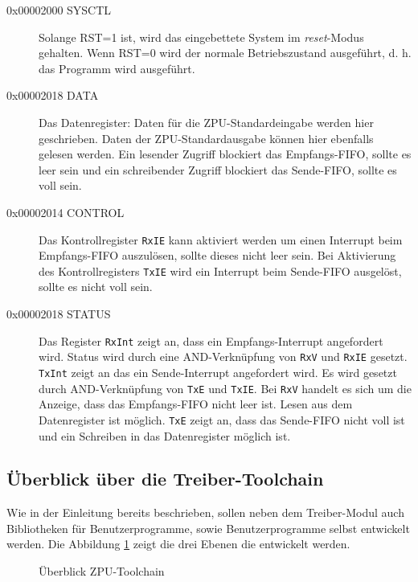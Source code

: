 \documentclass[11pt]{scrartcl}
\begin{document}
\begin{description}

    \item[0x00002000 SYSCTL]
    Solange RST=1 ist, wird das eingebettete System im \textit{reset}-Modus gehalten. Wenn RST=0 wird der normale Betriebszustand ausgeführt, d. h. das Programm wird ausgeführt.
    
     \item[0x00002018 DATA]
     Das Datenregister: Daten für die ZPU-Standardeingabe werden hier geschrieben. Daten der ZPU-Standardausgabe können hier ebenfalls gelesen werden. Ein lesender Zugriff blockiert das Empfangs-FIFO, sollte es leer sein und ein schreibender Zugriff blockiert das Sende-FIFO, sollte es voll sein.  
    
    \item[0x00002014 CONTROL]
    Das Kontrollregister \texttt{RxIE} kann aktiviert werden um einen Interrupt beim Empfangs-FIFO auszulösen, sollte dieses nicht leer sein. Bei Aktivierung des Kontrollregisters \texttt{TxIE} wird ein Interrupt beim Sende-FIFO ausgelöst, sollte es nicht voll sein. 
    
    \item[0x00002018 STATUS]
    Das Register \texttt{RxInt} zeigt an, dass ein Empfangs-Interrupt angefordert wird. Status wird durch eine AND-Verknüpfung von \texttt{RxV} und \texttt{RxIE} gesetzt. \texttt{TxInt} zeigt an das ein Sende-Interrupt angefordert wird. Es wird gesetzt durch AND-Verknüpfung von \texttt{TxE} und \texttt{TxIE}. Bei \texttt{RxV} handelt es sich um die Anzeige, dass das Empfangs-FIFO nicht leer ist. Lesen aus dem Datenregister ist möglich. \texttt{TxE} zeigt an, dass das Sende-FIFO nicht voll ist und ein Schreiben in das Datenregister möglich ist.
 
\end{description}

\subsection{Überblick über die Treiber-Toolchain}
Wie in der Einleitung bereits beschrieben, sollen neben dem Treiber-Modul auch Bibliotheken für Benutzerprogramme, sowie Benutzerprogramme selbst entwickelt werden. Die Abbildung \ref{zpu_overview} zeigt die drei Ebenen die entwickelt werden.

\begin{figure}
	\begin{center}
		
		\caption{Überblick ZPU-Toolchain}
		\label{zpu_overview}	
	\end{center}
\end{figure}
\end{document}
